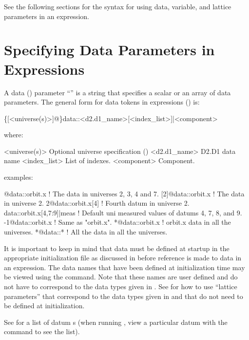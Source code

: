 See the following sections for the syntax for using data, variable, and
lattice parameters in an expression.

\section{Specifying Data Parameters in Expressions}
\label{s:data.token}

A data () parameter ``'' is a string that specifies a scalar or an array
of data parameters.  The general form for data tokens in expressions () is:
\begin{example}
  \{[<universe(s)>]@\}data::<d2.d1_name>[<index_list>]|<component>
\end{example}
where:
\begin{example}
  <universe(s)>       Optional universe specification ()
  <d2.d1_name>        D2.D1 data name
  <index_list>        List of indexes.
  <component>         Component. 
\end{example}
examples:
\begin{example}
  [2:4,7]@data::orbit.x      ! The  data in universes 2, 3, 4 and 7.
  [2]@data::orbit.x          ! The  data in universe 2. 
  2@data::orbit.x[4]         ! Fourth  datum in universe 2.
  data::orbit.x[4,7:9]|meas  ! Default uni measured values of datums 4, 7, 8, and 9.
  -1@data::orbit.x           ! Same as "orbit.x".
  *@data::orbit.x            ! orbit.x data in all the universes.
  *@data::*                  ! All the data in all the universes.
\end{example}

It is important to keep in mind that data must be defined at startup in the appropriate
initialization file as discussed in  before reference is made to data in an
expression. The  data names that have been defined at initialization time may be
viewed using the  command. Note that these names are user defined and do not have to
correspond to the data types given in . See  for how to use
``lattice parameters'' that correspond to the data types given in  and that do
not need to be defined at initialization.

See  for a list of datum s (when running \tao, view a
particular datum with the  command to see the list).

